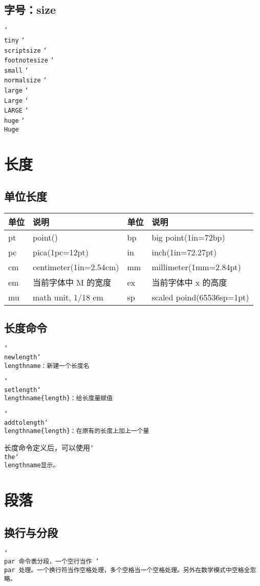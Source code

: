 \documentclass[a4paper]{article}
\newcommand\tbs[1][]{\tt\char`\\#1}
\begin{document}
  \subsection{字号：size}
    {\tiny \tbs{tiny}}
    {\scriptsize\tbs{scriptsize}}
    {\footnotesize\tbs{footnotesize}}
    {\small\tbs{small}}
    {\normalsize\tbs{normalsize}}
    {\large\tbs{large}}
    {\Large\tbs{Large}}
    {\LARGE\tbs{LARGE}}
    {\huge\tbs{huge}}
    {\Huge\tbs{Huge}}
\section{长度}
\subsection{单位长度}
    \begin{tabular}{|ll|ll|}
      \hline
      单位 & 说明 & 单位 & 说明\\
      \hline
      pt & point() & bp & big point(1in=72bp)\\
      \hline
      pc & pica(1pc=12pt) & in & inch(1in=72.27pt)\\
      \hline
      cm & centimeter(1in=2.54cm) & mm & millimeter(1mm=2.84pt) \\
      \hline
      em & 当前字体中 M 的宽度 & ex & 当前字体中 x 的高度\\
      \hline
      mu & math unit, 1/18 em & sp & scaled poind(65536sp=1pt)\\
      \hline
    \end{tabular}
\subsection{长度命令}
    \tbs{newlength}\tbs{lengthname}：新建一个长度名

    \tbs{setlength}\tbs{lengthname}\{length\}：给长度量赋值

    \tbs{addtolength}\tbs{lengthname}\{length\}：在原有的长度上加上一个量

    长度命令定义后，可以使用\tbs{the}\tbs{lengthname}显示。
\section{段落}
  \subsection{换行与分段}
    \tbs{par} 命令表分段，一个空行当作 \tbs{par} 处理。一个换行符当作空格处理，多个空格当一个空格处理。另外在数学模式中空格全忽略。
\end{document}
